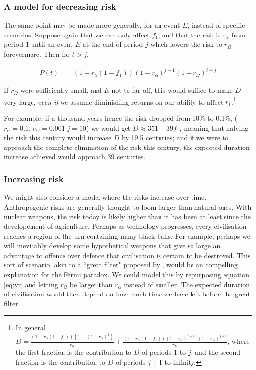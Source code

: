 \documentclass[british]{article}
\begin{document}
\subsubsection{A model for decreasing risk} The same point may be made more generally, for an event $E$, instead of specific scenarios. Suppose again that we can only affect $f_1$, and that the risk is $r_\alpha$ from period $1$ until an event \(E\) at the end of period \(j\) which lowers the risk to $r_\Omega$ forevermore. Then for $t>j$,


\begin{align}
P(t) &= (1-r_\alpha(1-f_1)) (1-r_\alpha)^{j-1} (1-r_\Omega)^{t-j} \label{eq:vr}
\end{align}

If $r_\Omega$ were sufficiently small, and $E$ not to far off, this would suffice to make $D$ very large, \emph{even if} we assume diminishing returns on our ability to affect $r_1$.\footnote{In general $D=  \frac{(1-r_\alpha(1-f_1)) (1-(1 - r_\alpha)^j)}{r_\alpha} + \frac{(1-r_\alpha(1-f_1)) (1-r_\alpha)^{j-1} \cdot (1-r_\Omega)^{j+1}}{r_\Omega}$, where the first fraction is the contribution to $D$ of periods 1 to $j$, and the second fraction is the contribution to $D$ of periods $j+1$ to infinity.} 

For example, if a thousand years hence the risk dropped from 10\% to 0.1\%, ($r_\alpha=0.1$, $r_\Omega=0.001$ $j=10$) we would get $D\approx 351+ 39f_1$, meaning that halving the risk this century would increase $D$ by 19.5 centuries; and if we were to approach the complete elimination of the risk this century, the expected duration increase achieved would approach 39 centuries.

\subsubsection{Increasing risk} We might also consider a model where the risks increase over time. Anthropogenic risks are generally thought to loom larger than natural ones. With nuclear weapons, the risk today is likely higher than it has been at least since the developement of agriculture. Perhaps as technology progresses, every civilisation reaches a region of the urn containing many black balls. For example, perhaps we will inevitably develop some hypothetical weapons that give so large an advantage to offence over defence that civilisation is certain to be destroyed. This sort of scenario, akin to a ``great filter" proposed by \cite{hanson_great_1998}, would be an compelling explanation for the Fermi paradox. We could model this by repurposing equation \ref{eq:vr} and letting $r_\Omega$ be larger than $r_\alpha$ instead of smaller. The expected duration of civilisation would then depend on how much time we have left before the great filter.
\end{document}
